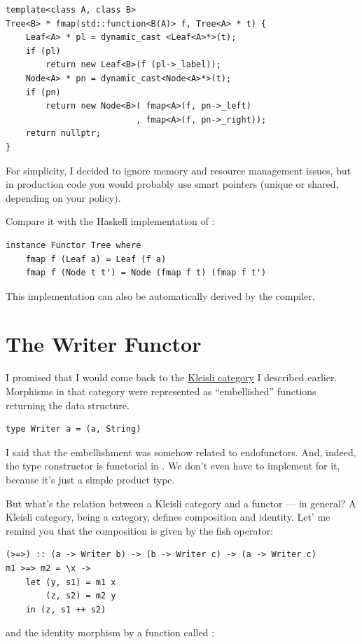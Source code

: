 \begin{Verbatim}
template<class A, class B>
Tree<B> * fmap(std::function<B(A)> f, Tree<A> * t) {
    Leaf<A> * pl = dynamic_cast <Leaf<A>*>(t);
    if (pl)
        return new Leaf<B>(f (pl->_label));
    Node<A> * pn = dynamic_cast<Node<A>*>(t);
    if (pn)
        return new Node<B>( fmap<A>(f, pn->_left) 
                          , fmap<A>(f, pn->_right));
    return nullptr;
}
\end{Verbatim}
For simplicity, I decided to ignore memory and resource management
issues, but in production code you would probably use smart pointers
(unique or shared, depending on your policy).

Compare it with the Haskell implementation of :

\begin{Verbatim}
instance Functor Tree where
    fmap f (Leaf a) = Leaf (f a)
    fmap f (Node t t') = Node (fmap f t) (fmap f t')
\end{Verbatim}
This implementation can also be automatically derived by the compiler.

\section{The Writer Functor}

I promised that I would come back to the \hyperref[kleisli-categories-page]{Kleisli
category} I described earlier. Morphisms in that category were
represented as ``embellished'' functions returning the 
data structure.

\begin{Verbatim}
type Writer a = (a, String)
\end{Verbatim}
I said that the embellishment was somehow related to endofunctors. And,
indeed, the  type constructor is functorial in
. We don't even have to implement  for it,
because it's just a simple product type.

But what's the relation between a Kleisli category and a functor --- in
general? A Kleisli category, being a category, defines composition and
identity. Let' me remind you that the composition is given by the fish
operator:

\begin{Verbatim}
(>=>) :: (a -> Writer b) -> (b -> Writer c) -> (a -> Writer c)
m1 >=> m2 = \x ->
    let (y, s1) = m1 x
        (z, s2) = m2 y 
    in (z, s1 ++ s2)
\end{Verbatim}
and the identity morphism by a function called :

